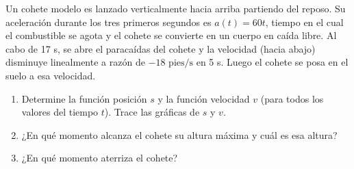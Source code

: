 \item Un cohete modelo es lanzado verticalmente hacia arriba partiendo del reposo. Su aceleración durante los tres primeros segundos es $a(t) = 60t$, tiempo en el cual el combustible se agota y el cohete se convierte en un cuerpo en caída libre. Al cabo de 17 s, se abre el paracaídas del cohete y la velocidad (hacia abajo) disminuye linealmente a razón de $-18 \text{ pies/s}$ en 5 s. Luego el cohete se posa en el suelo a esa velocidad.
\begin{enumerate}
    \item[(a)] Determine la función posición $s$ y la función velocidad $v$ (para todos los valores del tiempo $t$). Trace las gráficas de $s$ y $v$.
    \item[(b)] ¿En qué momento alcanza el cohete su altura máxima y cuál es esa altura?
    \item[(c)] ¿En qué momento aterriza el cohete?
\end{enumerate}

